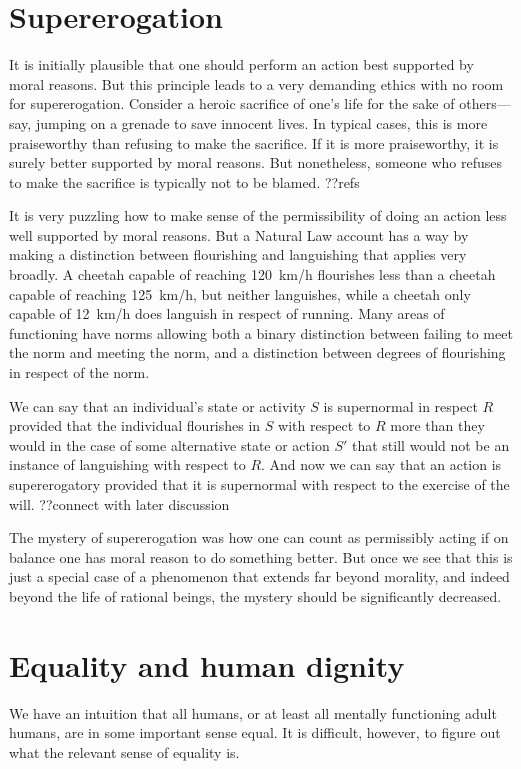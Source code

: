\section{Supererogation}
It is initially plausible that one should perform an action best supported by moral reasons. But this principle
leads to a very demanding ethics with no room for supererogation. Consider a heroic sacrifice of one's life for
the sake of others---say, jumping on a grenade to save innocent lives. In typical cases, this is more praiseworthy 
than refusing to make the sacrifice. If it is more praiseworthy, it is surely better supported by moral reasons. 
But nonetheless, someone who refuses to make the sacrifice is typically not to be blamed. ??refs

It is very puzzling how to make sense of the permissibility of doing an action less well supported by moral reasons. 
But a Natural Law account has a way by making a distinction between flourishing and languishing that applies very
broadly. A cheetah capable of reaching 120~km/h flourishes less than a cheetah capable of reaching 125~km/h, but 
neither languishes, while a cheetah only capable of 12~km/h does languish in respect of running. Many areas of 
functioning have norms allowing both a binary distinction between failing to meet the norm and meeting the norm,
and a distinction between degrees of flourishing in respect of the norm. 

We can say that an individual's state or activity $S$ is supernormal in respect $R$ provided that the individual flourishes 
in $S$ with respect to $R$ more than they would in the case of some alternative state or action $S'$ that
still would not be an instance of languishing with respect to $R$. And now we can say that an action is supererogatory
provided that it is supernormal with respect to the exercise of the will. 
??connect with later discussion

The mystery of supererogation was how one can count as permissibly acting if on balance one has moral reason to do something 
better. But once we see that this is just a special case of a phenomenon that extends far beyond morality, and indeed beyond
the life of rational beings, the mystery should be significantly decreased.

\section{Equality and human dignity}
We have an intuition that all humans, or at least all mentally functioning adult humans, are in some important sense 
equal. It is difficult, however, to figure out what the relevant sense of equality is. 

